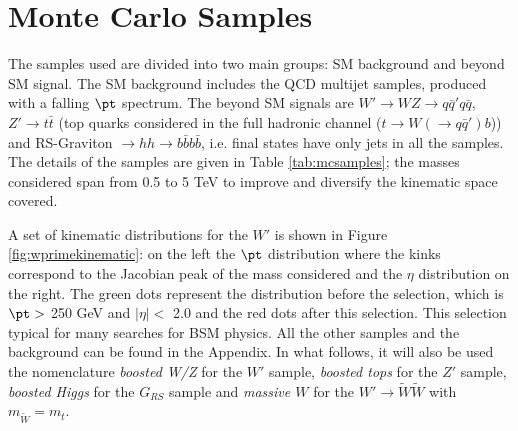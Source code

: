 
\section{Monte Carlo Samples}
\label{appendixA}


The samples used are divided into two main groups: SM background and beyond SM signal. The SM background includes the QCD multijet samples, produced with a falling $\pt$ spectrum. The beyond SM signals are $W'\to WZ\to q\bar{q}'q\bar{q}$, $Z'\to t\bar{t}$ (top quarks considered in the full hadronic channel ($t\to W(\to q\bar{q}')b$)) and RS-Graviton $\to hh \to b\bar{b}b\bar{b}$, i.e. final states have only jets in all the samples. The details of the samples are given in Table \ref{tab:mcsamples}; the masses considered span from 0.5 to 5 TeV to improve and diversify the kinematic space covered.

A set of kinematic distributions for the $W'$ is shown in Figure \ref{fig:wprimekinematic}: on the left the $\pt$ distribution where the kinks correspond to the Jacobian peak of the mass considered and the $\eta$ distribution on the right. The green dots represent the distribution before the selection, which is $\pt >$ 250 GeV and $|\eta|<$ 2.0 and the red dots after this selection. This selection typical for many searches for BSM physics.  All the other samples and the background can be found in the Appendix. 
In what follows, it will also be used the nomenclature \textit{boosted W/Z} for the $W'$ sample, \textit{boosted tops} for the $Z'$ sample, \textit{boosted Higgs} for the $G_{RS}$ sample and \textit{massive $W$} for the $W' \to \tilde{W}\tilde{W}$ with $m_{\tilde{W}}=m_t$.

